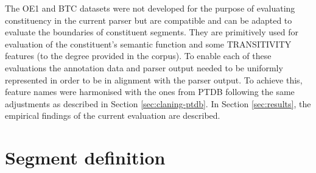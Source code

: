    \begin{table}[!ht]
        \centering
        \caption{Evaluation corpus summary}
        \label{tab:corpus-sumary}
    \end{table}

    The OE1 and BTC datasets were not developed for the purpose of evaluating constituency in the current parser but are compatible and can be adapted to evaluate the boundaries of constituent segments. They are primitively used for evaluation of the constituent's semantic function and some TRANSITIVITY features (to the degree provided in the corpus). To enable each of these evaluations the annotation data and parser output needed to be uniformly represented in order to be in alignment with the parser output. To achieve this, feature names were harmonised with the ones from PTDB following the same adjustments as described in Section \ref{sec:claning-ptdb}. In Section \ref{sec:results},  the empirical findings of the current evaluation are described.

\section{Segment definition}

